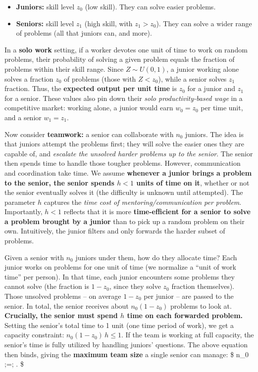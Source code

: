 \documentclass[12pt]{article}
\begin{document}
\begin{itemize}
\tightlist
\item
  \textbf{Juniors:} skill level \(z_0\) (low skill). They can solve
  easier problems.
\item
  \textbf{Seniors:} skill level \(z_1\) (high skill, with
  \(z_1 > z_0\)). They can solve a wider range of problems (all that
  juniors can, and more).
\end{itemize}

In a \textbf{solo work} setting, if a worker devotes one unit of time to
work on random problems, their probability of solving a given problem
equals the fraction of problems within their skill range. Since
\(Z \sim U(0,1)\), a junior working alone solves a fraction \(z_0\) of
problems (those with \(Z < z_0\)), while a senior solves \(z_1\)
fraction. Thus, the \textbf{expected output per unit time} is \(z_0\)
for a junior and \(z_1\) for a senior. These values also pin down their
\emph{solo productivity-based wage} in a competitive market: working
alone, a junior would earn \(w_0 = z_0\) per time unit, and a senior
\(w_1 = z_1\).

Now consider \textbf{teamwork:} a senior can collaborate with \(n_0\)
juniors. The idea is that juniors attempt the problems first; they will
solve the easier ones they are capable of, and \emph{escalate the
unsolved harder problems up to the senior}. The senior then spends time
to handle those tougher problems. However, communication and
coordination take time. We assume \textbf{whenever a junior brings a
problem to the senior, the senior spends \(h < 1\) units of time on it},
whether or not the senior eventually solves it (the difficulty is
unknown until attempted). The parameter \(h\) captures the \emph{time
cost of mentoring/communication per problem}. Importantly, \(h<1\)
reflects that it is more \textbf{time-efficient for a senior to solve a
problem brought by a junior} than to pick up a random problem on their
own. Intuitively, the junior filters and only forwards the harder subset
of problems.

Given a senior with \(n_0\) juniors under them, how do they allocate
time? Each junior works on problems for one unit of time (we normalize a
``unit of work time'' per person). In that time, each junior encounters
some problems they cannot solve (the fraction is \(1 - z_0\), since they
solve \(z_0\) fraction themselves). Those unsolved problems -- on
average \(1-z_0\) per junior -- are passed to the senior. In total, the
senior receives about \(n_0 (1 - z_0)\) problems to look at.
\textbf{Crucially, the senior must spend \(h\) time on each forwarded
problem.} Setting the senior's total time to 1 unit (one time period of
work), we get a capacity constraint: \(n_0 (1 - z_0)\, h \le 1.\) If the
team is working at full capacity, the senior's time is fully utilized by
handling juniors' questions. The above equation then binds, giving the
\textbf{maximum team size} a single senior can manage: \$ n\_0 ;=;
. \$
\end{document}
